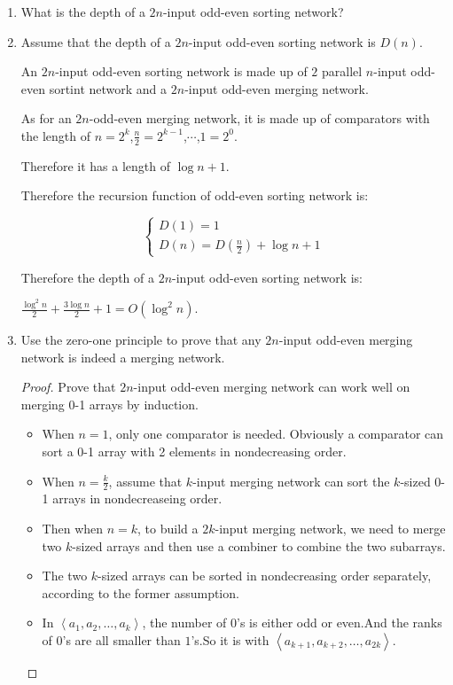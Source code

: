 \documentclass[12pt,a4paper]{article}
\makeatletter
\newtheorem*{solution}{Solution}
\theoremstyle{definition}
\renewenvironment{solution}[1][Solution] {\par\pushQED{\qed}\normalfont\topsep6\p@\@plus6\p@\relax\trivlist\item[\hskip\labelsep\bfseries#1\@addpunct{.}]\ignorespaces}{\popQED\endtrivlist\@endpefalse} \makeatother
\makeatother
\begin{document}
\begin{enumerate}
\begin{enumerate}
    	\item What is the depth of a $2n$-input odd-even sorting network?
    	    \begin{solution}
    	    	Assume that the depth of a $2n$-input odd-even sorting network is $D(n)$.
    	    	
    	    	An $2n$-input odd-even sorting network is made up of $2$ parallel $n$-input odd-even sortint network and a $2n$-input odd-even merging network.
    	    	
    	    	As for an $2n$-odd-even merging network, it is made up of comparators with the length of $n=2^k$,$\frac{n}{2}=2^{k-1}$,$\cdots$,$1=2^0$.
    	    	
    	    	Therefore it has a length of $\log n+1$.
    	    	
    	    	Therefore the recursion function of odd-even sorting network is:
    	    	
    	    	\begin{equation}
    	    	    \begin{cases}
    	    	    D(1)=1\\
    	    	    D(n)=D(\frac{n}{2})+\log n+1
    	    	    \end{cases}
    	        \end{equation}
    	    	
    	    	Therefore the depth of a $2n$-input odd-even sorting network is:
    	    	
    	    	 $\frac{\log^2 n}{2}+\frac{3\log n}{2}+1=O(\log^2 n)$.
    	    \end{solution}
    	\item
    	{\color{red}{(Optional Sub-question with Bonus)}} Use the zero-one principle to prove that any $2n$-input odd-even merging network is indeed a merging network.
    	\begin{proof}
    		Prove that $2n$-input odd-even merging network can work well on merging 0-1 arrays  by induction.
    		
    		\begin{itemize}
    			\item 
    			    When $n=1$, only one comparator is needed. Obviously a comparator can sort a 0-1 array with 2 elements in nondecreasing order.
    			    
    			\item 
    			    When $n=\frac{k}{2}$, assume that $k$-input merging network can sort the $k$-sized 0-1 arrays in nondecreaseing order.
    			\item 
    			    Then when $n=k$, to build a $2k$-input merging network, we need to merge two $k$-sized arrays and then use a combiner to combine the two subarrays.
    			\item    
    			    The two $k$-sized arrays can be sorted in nondecreasing order separately, according to the former assumption.
    			\item 
    			    In $\left\langle a_1,a_2,\ldots,a_k\right\rangle$, the number of $0$'s is either odd or even.And the ranks of $0$'s are all smaller than $1$'s.So it is with $\left\langle a_{k+1},a_{k+2},\ldots,a_{2k}\right\rangle$.
    			    

\end{itemize}
\end{proof}
\end{enumerate}
\end{enumerate}
\end{document}
